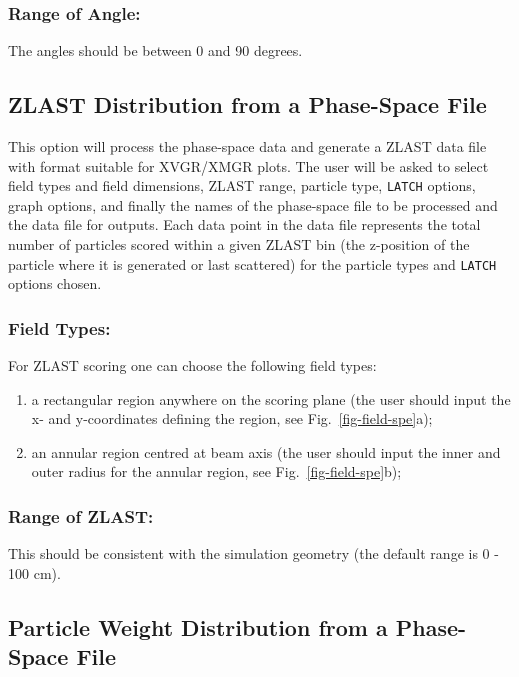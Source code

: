 \documentclass[12pt,twoside]{article}
\begin{document}
\subsubsection{Range of Angle:}
The angles should be between 0 and 90 degrees.

\subsection{ZLAST Distribution from a Phase-Space File}
This option will process the phase-space data and generate a ZLAST data
file with format suitable for XVGR/XMGR plots. The user will be asked to
select field types and field dimensions, ZLAST range, particle type,
\verb+LATCH+ options, graph options, and finally the names of the
phase-space file to be processed and the data file for outputs.  Each data
point in the data file represents the total number of particles scored
within a given ZLAST bin (the z-position of the particle where it is
generated or last scattered) for the particle types and \verb+LATCH+
options chosen.


\subsubsection{Field Types:}

For ZLAST scoring one can choose the following field types:

\begin{enumerate}
\item a rectangular region anywhere on the scoring plane (the user should
input the  x- and y-coordinates defining the region, see
Fig.~\ref{fig-field-spe}a);

\item an annular region centred at beam axis (the user should input the
inner and outer radius for the annular region, see
Fig.~\ref{fig-field-spe}b); \end{enumerate}

\subsubsection{Range of ZLAST:}

This should be consistent with the simulation geometry (the default range
is 0 - 100 cm).

\subsection{Particle Weight Distribution from a Phase-Space File}
\end{document}
